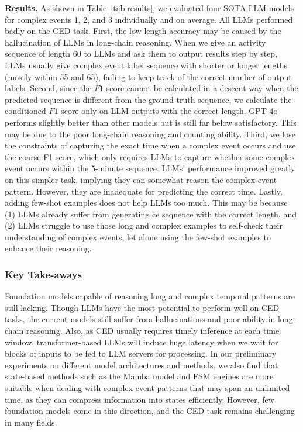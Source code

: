 \textbf{Results.} As shown in Table~\ref{tab:results}, we evaluated four SOTA LLM models for complex events 1, 2, and 3 individually and on average. All LLMs performed badly on the CED task. First, the low length accuracy may be caused by the hallucination of LLMs in long-chain reasoning. When we give an activity sequence of length 60 to LLMs and ask them to output results step by step, LLMs usually give complex event label sequence with shorter or longer lengths (mostly within 55 and 65), failing to keep track of the correct number of output labels. Second, since the $F1$ score cannot be calculated in a descent way when the predicted sequence is different from the ground-truth sequence, we calculate the conditioned $F1$ score only on LLM outputs with the correct length. GPT-4o performs slightly better than other models but is still far below satisfactory. This may be due to the poor long-chain reasoning and counting ability.  Third, we lose the constraints of capturing the exact time when a complex event occurs and use the coarse F1 score, which only requires LLMs to capture whether some complex event occurs within the 5-minute sequence. LLMs' performance improved greatly on this simpler task, implying they can somewhat reason the complex event pattern. However, they are inadequate for predicting the correct time. Lastly, adding few-shot examples does not help LLMs too much. This may be because (1) LLMs already suffer from generating ce sequence with the correct length, and (2) LLMs struggle to use those long and complex examples to self-check their understanding of complex events, let alone using the few-shot examples to enhance their reasoning. 

\subsubsection{Key Take-aways}
Foundation models capable of reasoning long and complex temporal patterns are still lacking. Though LLMs have the most potential to perform well on CED tasks, the current models still suffer from hallucinations and poor ability in long-chain reasoning. Also, as CED usually requires timely inference at each time window, transformer-based LLMs will induce huge latency when we wait for blocks of inputs to be fed to LLM servers for processing. %
In our preliminary experiments on different model architectures and methods, we also find that state-based methods such as the Mamba model and FSM engines are more suitable when dealing with complex event patterns that may span an unlimited time, as they can compress information into states efficiently. However, few foundation models come in this direction, and the CED task remains challenging in many fields.
